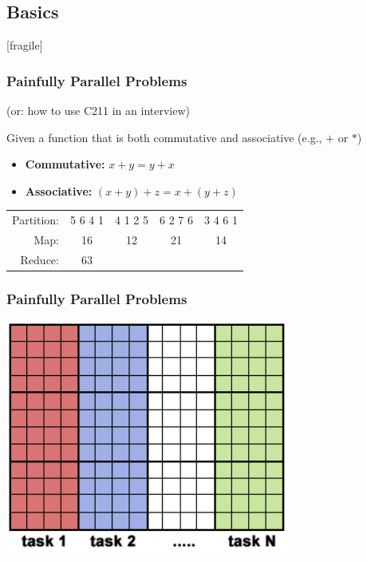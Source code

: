 \documentclass[t]{beamer}
\begin{document}
\subsection{Basics}[fragile]
\begin{frame}
\frametitle{Painfully Parallel Problems}
(or: how to use C211 in an interview)\\
\pause

Given a function that is both commutative and associative (e.g., $+$ or $*$)\\
\pause
\begin{itemize}
  \item \textbf{Commutative:} $x + y = y + x$ \\
  \item \textbf{Associative:} $(x + y) + z = x + (y + z)$
\end{itemize}

\begin{tabular}{rcccc}
Partition: & 5 6 4 1 & 4 1 2 5 & 6 2 7 6 & 3 4 6 1 \\ 
Map:       & 16 & 12 & 21 & 14 \\
Reduce:    & 63 & & & \\
\end{tabular}
\end{frame}


\begin{frame}
\frametitle{Painfully Parallel Problems}
\begin{center}
  \includegraphics[width=0.7\textwidth]{img/array.png} 
\end{center}
\end{frame}
\end{document}
